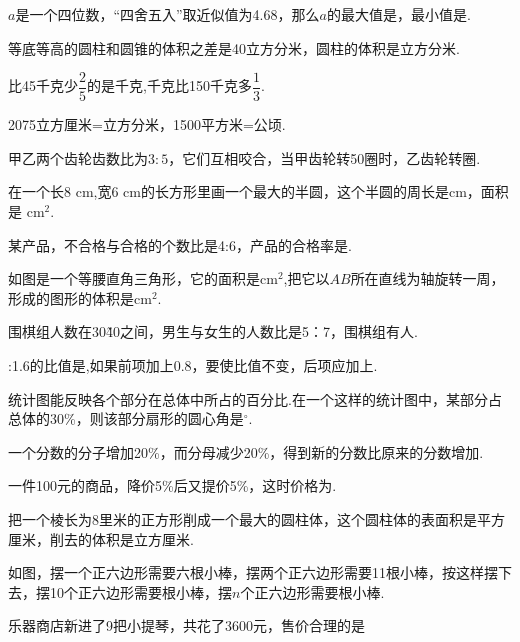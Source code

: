 \documentclass[marginline,answers]{BHCexam}
\begin{document}
\fubiaoti{}
\maketitle

\begin{questions}
\tiankong
\question $a$是一个四位数，“四舍五入”取近似值为4.68，那么$a$的最大值是，最小值是.

\question 等底等高的圆柱和圆锥的体积之差是40立方分米，圆柱的体积是立方分米.

\question 比45千克少$\dfrac{2}{5}$的是千克,千克比150千克多$\dfrac{1}{3}$.

\question 2075立方厘米=立方分米，1500平方米=公顷.

\question 甲乙两个齿轮齿数比为$3:5$，它们互相咬合，当甲齿轮转50圈时，乙齿轮转圈.

\question 在一个长8 cm,宽6 cm的长方形里画一个最大的半圆，这个半圆的周长是cm，面积是 cm$^{2}$.

\question 某产品，不合格与合格的个数比是4:6，产品的合格率是.

\question 如图是一个等腰直角三角形，它的面积是cm$^{2}$,把它以$AB$所在直线为轴旋转一周，形成的图形的体积是cm$^{2}$.

\question 围棋组人数在30\~40之间，男生与女生的人数比是5：7，围棋组有人.

:1.6的比值是,如果前项加上0.8，要使比值不变，后项应加上.

\question {}统计图能反映各个部分在总体中所占的百分比.在一个这样的统计图中，某部分占总体的30\%，则该部分扇形的圆心角是$^\circ$.

\question 一个分数的分子增加20\%，而分母减少20\%，得到新的分数比原来的分数增加.

\question 一件100元的商品，降价5\%后又提价5\%，这时价格为.

\question 把一个棱长为8里米的正方形削成一个最大的圆柱体，这个圆柱体的表面积是平方厘米，削去的体积是立方厘米.

\question 如图，摆一个正六边形需要六根小棒，摆两个正六边形需要11根小棒，按这样摆下去，摆10个正六边形需要根小棒，摆$n$个正六边形需要根小棒.


\xuanze

\question 乐器商店新进了9把小提琴，共花了3600元，售价合理的是


\end{questions}
\end{document}
